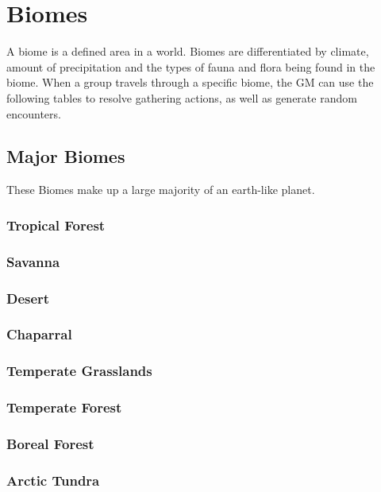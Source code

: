 \chapter{Biomes}\label{ch:biomes}
A biome is a defined area in a world.
Biomes are differentiated by climate, amount of precipitation and the types of fauna and flora being found in the biome.
When a group travels through a specific biome, the GM can use the following tables to resolve gathering actions, as well as generate random encounters.

\section{Major Biomes}\label{sec:biomesMajor}
These Biomes make up a large majority of an earth-like planet.

\subsection{Tropical Forest}\label{subsec:biomeTropicalForest}
\subsection{Savanna}\label{subsec:biomeSavanna}
\subsection{Desert}\label{subsec:biomeDesert}
\subsection{Chaparral}\label{subsec:biomeChapparal}
\subsection{Temperate Grasslands}\label{subsec:biomeTemperateGrassland}
\subsection{Temperate Forest}\label{subsec:biomeTemperateForest}
\subsection{Boreal Forest}\label{subsec:biomeBorealForest}
\subsection{Arctic Tundra}\label{subsec:biomeArcticTundra}

